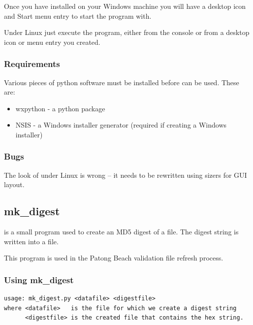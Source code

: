 \documentclass{manual}
\begin{document}
Once you have installed  on your Windows machine you will have a desktop
icon and Start menu entry to start the program with.

Under Linux just execute the  program, either from the console or
from a desktop icon or menu entry you created.

\subsubsection{Requirements}
\label{subsubsec:event_selection_requirements}

Various pieces of python software must be installed before  can be used.
These are:

\begin{itemize}
  \item wxpython - a python package
  \item NSIS - a Windows installer generator (required if creating a Windows installer)
\end{itemize}

\subsubsection{Bugs}
\label{subsubsec:event_selection_bugs}

The look of  under Linux is wrong -- it needs to be rewritten using sizers for GUI layout.

\pagebreak

\subsection{mk_digest}
\label{subsec:mk_digest}

 is a small program used to create an MD5 digest of a file.  The digest string
is written into a file.

This  program is used in the Patong Beach validation file refresh process.

\subsubsection{Using mk_digest}
\label{subsubsec:mk_digest_use}

\begin{verbatim}
usage: mk_digest.py <datafile> <digestfile>
where <datafile>   is the file for which we create a digest string
      <digestfile> is the created file that contains the hex string.
\end{verbatim}
\end{document}
